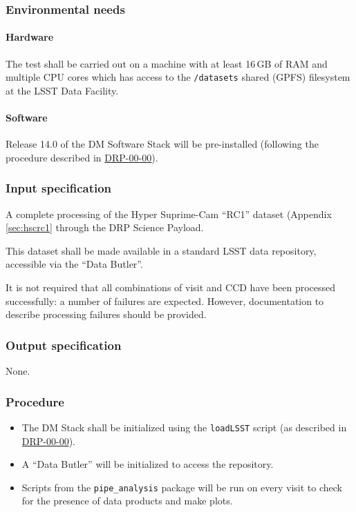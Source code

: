 \subsubsection{Environmental needs}

\paragraph{Hardware}

The test shall be carried out on a machine with at least 16\,GB of RAM and
multiple CPU cores which has access to the \texttt{/datasets} shared (GPFS)
filesystem at the LSST Data Facility.

\paragraph{Software}

Release 14.0 of the DM Software Stack will be pre-installed (following the
procedure described in \hyperref[drp-00-00]{DRP-00-00}).

\subsubsection{Input specification}

A complete processing of the Hyper Suprime-Cam ``RC1'' dataset (Appendix
\ref{sec:hscrc1} through the DRP Science Payload.

This dataset shall be made available in a standard LSST data repository,
accessible via the ``Data Butler''.

It is not required that all combinations of visit and CCD have been processed
successfully: a number of failures are expected. However, documentation to
describe processing failures should be provided.

\subsubsection{Output specification}

None.

\subsubsection{Procedure}

\begin{itemize}

  \item{The DM Stack shall be initialized using the \texttt{loadLSST} script
  (as described in \hyperref[drp-00-00]{DRP-00-00}).}

  \item{A ``Data Butler'' will be initialized to access the repository.}

  \item{Scripts from the \texttt{pipe\_analysis} package will be run on every visit to check for the presence of data products and make plots.}

\end{itemize}
